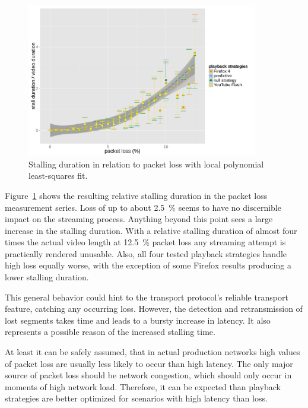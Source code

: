 \begin{figure}[htbp]
	\centering
	\includegraphics[width=0.9\textwidth]{images/R-playbackemulation-stallduration-loss.pdf}
	\caption{Stalling duration in relation to packet loss with local polynomial least-squares fit.}
\label{c3:fig:eval-loss-stallingtime}
\end{figure}

Figure~\ref{c3:fig:eval-loss-stallingtime} shows the resulting relative stalling duration in the packet loss measurement series. Loss of up to about \SI{2.5}{\percent} seems to have no discernible impact on the streaming process. Anything beyond this point sees a large increase in the stalling duration. With a relative stalling duration of almost four times the actual video length at \SI{12.5}{\percent} packet loss any streaming attempt is practically rendered unusable. Also, all four tested playback strategies handle high loss equally worse, with the exception of some Firefox results producing a lower stalling duration.

This general behavior could hint to the transport protocol's reliable transport feature, catching any occurring loss. However, the detection and retransmission of lost segments takes time and leads to a bursty increase in latency. It also represents a possible reason of the increased stalling time. 

At least it can be safely assumed, that in actual production networks high values of packet loss are usually less likely to occur than high latency. The only major source of packet loss should be network congestion, which should only occur in moments of high network load. Therefore, it can be expected than playback strategies are better optimized for scenarios with high latency than loss.

